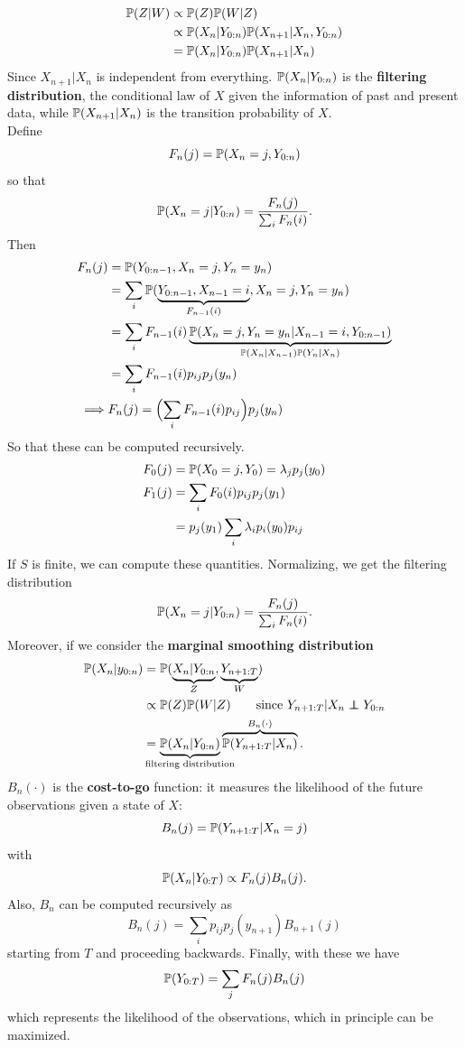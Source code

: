 \documentclass{article}
\begin{document}
\begin{align*}
    \mathbb{P}(Z|W)&\propto\mathbb{P}(Z)\mathbb{P}(W|Z)\\
    &\propto\mathbb{P}(X_n|Y_{0:n})\mathbb{P}(X_{n+1}|X_n,Y_{0:n})\\
    &=\mathbb{P}(X_n|Y_{0:n})\mathbb{P}(X_{n+1}|X_n)
\end{align*}
Since $X_{n+1}|X_n$ is independent from everything. $\mathbb{P}(X_n|Y_{0:n})$ is the \textbf{filtering distribution}, the conditional law of $X$ given the information of past and present data, while $\mathbb{P}(X_{n+1}|X_n)$ is the transition probability of $X$. \\Define
\[F_n(j)=\mathbb{P}(X_n=j,Y_{0:n})\] so that
\[
\mathbb{P}(X_n=j|Y_{0:n})=\frac{F_n(j)}{\sum_i F_n(i)}.
\]
Then
\begin{align*}
    F_n(j)&=\mathbb{P}(Y_{0:n-1},X_n=j,Y_n=y_n)\\
    &=\sum_i\mathbb{P}(\underbrace{Y_{0:n-1},X_{n-1}=i}_{F_{n-1}(i)},X_n=j,Y_n=y_n)\\
    &=\sum_i F_{n-1}(i)\underbrace{\mathbb{P}(X_n=j,Y_n=y_n|X_{n-1}=i,Y_{0:n-1})}_{\mathbb{P}(X_n|X_{n-1})\mathbb{P}(Y_n|X_n)}\\
    &=\sum_i F_{n-1}(i)p_{ij}p_j(y_n)\\
    \implies &F_n(j)=\Bigl(\sum_iF_{n-1}(i)p_{ij}\Bigr)p_j(y_n)
\end{align*}
So that these can be computed recursively.
\begin{align*}
    F_0(j)&=\mathbb{P}(X_0=j,Y_0)=\lambda_jp_j(y_0)\\
    F_1(j)&=\sum_i F_0(i)p_{ij}p_j(y_1)\\
    &=p_j(y_1)\sum_i\lambda_i p_i(y_0)p_{ij}
\end{align*}
If $S$ is finite, we can compute these quantities. Normalizing, we get the filtering distribution
\[
\mathbb{P}(X_n=j|Y_{0:n})=\frac{F_n(j)}{\sum_i F_n(i)}.
\]
Moreover, if we consider the \textbf{marginal smoothing distribution}
\begin{align*}
    \prob(X_n|y_{0:n})&=\prob(\underbrace{X_n|Y_{0:n}}_{Z},\underbrace{Y_{n+1:T}}_{W})\\
    &\propto\prob(Z)\prob(W|Z)\qquad\text{since }Y_{n+1:T}|X_n \independent Y_{0:n}\\
    &=\underbrace{\prob(X_n|Y_{0:n})}_{\mathclap{\text{filtering distribution}}}\overbrace{\prob(Y_{n+1:T}|X_n)}^{\mathclap{B_n(\cdot)}}.
\end{align*}
$B_n(\cdot)$ is the \textbf{cost-to-go} function: it measures the likelihood of the future observations given a state of $X$:
\[B_n(j)=\mathbb{P}(Y_{n+1:T}|X_n=j)\]
with
\[
\mathbb{P}(X_n|Y_{0:T})\propto F_n(j)B_n(j).
\]
Also, $B_n$ can be computed recursively as
\[B_n(j)=\sum_i p_{ij}p_{j}(y_{n+1})B_{n+1}(j)\]
starting from $T$ and proceeding backwards. Finally, with these we have
\[
\mathbb{P}(Y_{0:T})=\sum_jF_n(j)B_n(j)
\]
which represents the likelihood of the observations, which in principle can be maximized.
\end{document}
